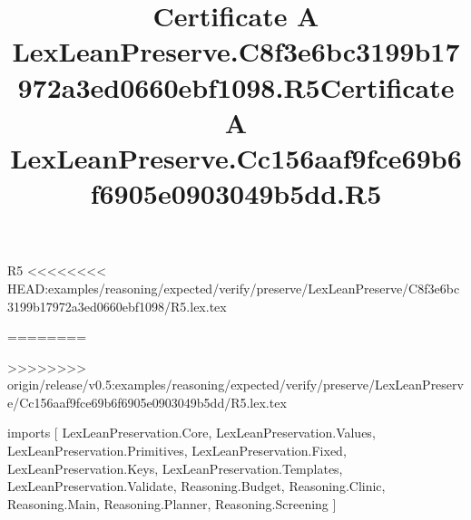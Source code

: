 \begin{lexlean}{R5}
<<<<<<<< HEAD:examples/reasoning/expected/verify/preserve/LexLeanPreserve/C8f3e6bc3199b17972a3ed0660ebf1098/R5.lex.tex
\title{Certificate A LexLeanPreserve.C8f3e6bc3199b17972a3ed0660ebf1098.R5}
========
\title{Certificate A LexLeanPreserve.Cc156aaf9fce69b6f6905e0903049b5dd.R5}
>>>>>>>> origin/release/v0.5:examples/reasoning/expected/verify/preserve/LexLeanPreserve/Cc156aaf9fce69b6f6905e0903049b5dd/R5.lex.tex
\begin{coremodule}
imports [
  LexLeanPreservation.Core,
  LexLeanPreservation.Values,
  LexLeanPreservation.Primitives,
  LexLeanPreservation.Fixed,
  LexLeanPreservation.Keys,
  LexLeanPreservation.Templates,
  LexLeanPreservation.Validate,
  Reasoning.Budget,
  Reasoning.Clinic,
  Reasoning.Main,
  Reasoning.Planner,
  Reasoning.Screening
]


\end{coremodule}
\end{lexlean}
